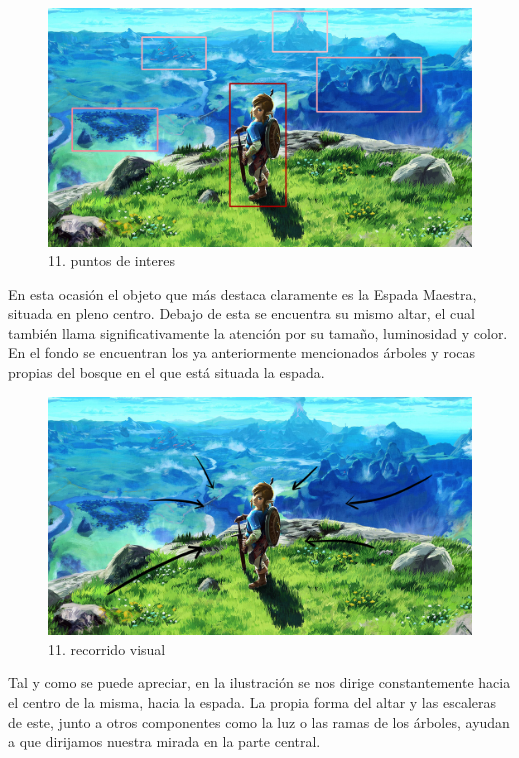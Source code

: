 \documentclass[12pt]{article}
\begin{document}
      \begin{figure}[H]
      \centering
      \includegraphics[scale=0.35]{images/Carlos/15/CuadrosRositas.jpg}
      \caption{\small 11. puntos de interes}
      \end{figure}
      En esta ocasión el objeto que más destaca claramente es la Espada Maestra, situada en pleno centro. Debajo de esta se encuentra su mismo altar, el cual también llama significativamente la atención por su tamaño, luminosidad y color. En el fondo se encuentran los ya anteriormente mencionados árboles y rocas propias del bosque en el que está situada la espada.
      \begin{figure}[H]
      \centering
      \includegraphics[scale=0.35]{images/Carlos/15/Flechas.jpg}
      \caption{\small 11. recorrido visual}
      \end{figure}
      Tal y como se puede apreciar, en la ilustración se nos dirige constantemente hacia el centro de la misma, hacia la espada. La propia forma del altar y las escaleras de este, junto a otros componentes como la luz o las ramas de los árboles, ayudan a que dirijamos nuestra mirada en la parte central.
\end{document}

